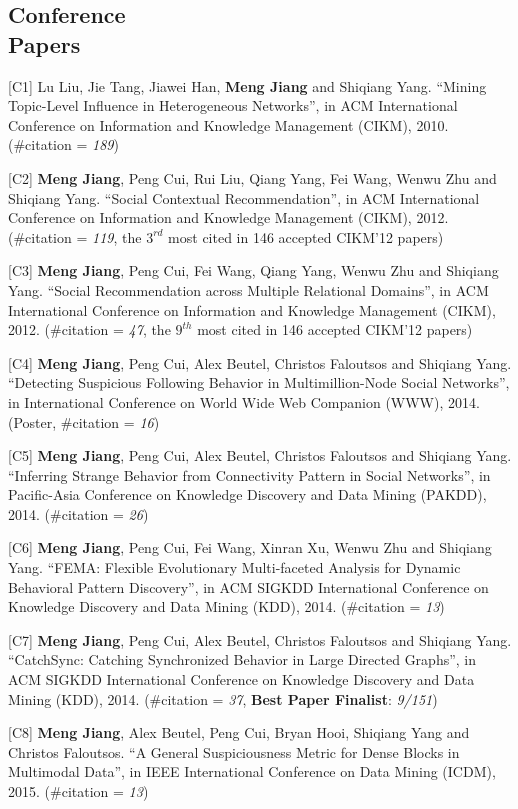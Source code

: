 \documentclass[margin, 10pt]{res}
\begin{document}
\begin{resume}
\section{Conference \\ Papers}

[C1] Lu Liu, Jie Tang, Jiawei Han, \textbf{Meng Jiang} and Shiqiang Yang. ``Mining Topic-Level Influence in Heterogeneous Networks'', in ACM International Conference on Information and Knowledge Management (CIKM), 2010. (\#citation = \textit{189})

[C2] \textbf{Meng Jiang}, Peng Cui, Rui Liu, Qiang Yang, Fei Wang, Wenwu Zhu and Shiqiang Yang. ``Social Contextual Recommendation'', in ACM International Conference on Information and Knowledge Management (CIKM), 2012. (\#citation = \textit{119}, the $3^{rd}$ most cited in 146 accepted CIKM'12 papers)

[C3] \textbf{Meng Jiang}, Peng Cui, Fei Wang, Qiang Yang, Wenwu Zhu and Shiqiang Yang. ``Social Recommendation across Multiple Relational Domains'', in ACM International Conference on Information and Knowledge Management (CIKM), 2012. (\#citation = \textit{47}, the $9^{th}$ most cited in 146 accepted CIKM'12 papers)

[C4] \textbf{Meng Jiang}, Peng Cui, Alex Beutel, Christos Faloutsos and Shiqiang Yang. ``Detecting Suspicious Following Behavior in Multimillion-Node Social Networks'', in International Conference on World Wide Web Companion (WWW), 2014. (Poster, \#citation = \textit{16})

[C5] \textbf{Meng Jiang}, Peng Cui, Alex Beutel, Christos Faloutsos and Shiqiang Yang. ``Inferring Strange Behavior from Connectivity Pattern in Social Networks'', in Pacific-Asia Conference on Knowledge Discovery and Data Mining (PAKDD), 2014. (\#citation = \textit{26})

[C6] \textbf{Meng Jiang}, Peng Cui, Fei Wang, Xinran Xu, Wenwu Zhu and Shiqiang Yang. ``FEMA: Flexible Evolutionary Multi-faceted Analysis for Dynamic Behavioral Pattern Discovery'', in ACM SIGKDD International Conference on Knowledge Discovery and Data Mining (KDD), 2014. (\#citation = \textit{13})

[C7] \textbf{Meng Jiang}, Peng Cui, Alex Beutel, Christos Faloutsos and Shiqiang Yang. ``CatchSync: Catching Synchronized Behavior in Large Directed Graphs'', in ACM SIGKDD International Conference on Knowledge Discovery and Data Mining (KDD), 2014. (\#citation = \textit{37}, \textbf{Best Paper Finalist}: \textit{9/151})

[C8] \textbf{Meng Jiang}, Alex Beutel, Peng Cui, Bryan Hooi, Shiqiang Yang and Christos Faloutsos. ``A General Suspiciousness Metric for Dense Blocks in Multimodal Data'', in IEEE International Conference on Data Mining (ICDM), 2015. (\#citation = \textit{13})


\end{resume}
\end{document}
